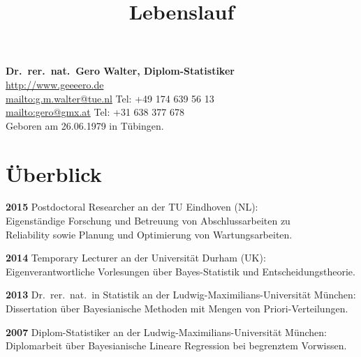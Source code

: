 \documentclass[a4paper]{simplecv}
\begin{document}
\pagestyle{myheadings}




\title{Lebenslauf}


\vspace*{-10ex}
\maketitle

\textbf{\large Dr.\ rer.\ nat.\ Gero Walter, Diplom-Statistiker}\\[2ex]
\url{http://www.geeeero.de}\\
\url{mailto:g.m.walter@tue.nl} \hfill Tel: +49 174 639 56 13\\
\url{mailto:gero@gmx.at}       \hfill Tel: +31 638 377 678\\

Geboren am 26.06.1979 in T\"{u}bingen.

\section{Überblick}
\begin{topic}
\item[\bfseries 2015] Postdoctoral Researcher an der TU Eindhoven (NL):\\
Eigenständige Forschung und Betreuung von Abschlussarbeiten zu\\ Reliability sowie Planung und Optimierung von Wartungsarbeiten.
\item[\bfseries 2014] Temporary Lecturer an der Universität Durham (UK):\\
Eigenverantwortliche Vorlesungen über Bayes-Statistik und Entscheidungstheorie.
\item[\bfseries 2013] Dr.\ rer.\ nat.\ in Statistik an der Ludwig-Maximilians-Universität München:
Dissertation über Bayesianische Methoden mit Mengen von Priori-Verteilungen.
\item[\bfseries 2007] Diplom-Statistiker an der Ludwig-Maximilians-Universität München:
Diplomarbeit über Bayesianische Lineare Regression bei begrenztem Vorwissen.
\end{topic}
\end{document}
